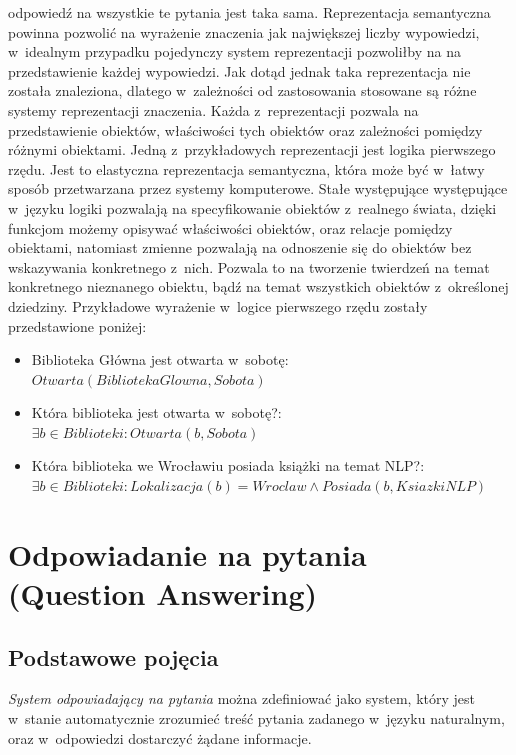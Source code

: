 \documentclass[a4paper, twoside, 12pt]{report}
\begin{document}
                odpowiedź na wszystkie te pytania jest taka sama. Reprezentacja semantyczna powinna pozwolić na wyrażenie
                znaczenia jak największej liczby wypowiedzi, w~idealnym przypadku pojedynczy system reprezentacji pozwoliłby
                na na przedstawienie każdej wypowiedzi. Jak dotąd jednak taka reprezentacja nie została znaleziona, dlatego
                w~zależności od zastosowania stosowane są różne systemy reprezentacji znaczenia. Każda z~reprezentacji
                pozwala na przedstawienie obiektów, właściwości tych obiektów oraz zależności pomiędzy różnymi obiektami.
                Jedną z~przykładowych reprezentacji jest logika pierwszego rzędu\cite{SEMANTICPARSING}. Jest to elastyczna reprezentacja semantyczna,
                która może być w~łatwy sposób przetwarzana przez systemy komputerowe. Stałe występujące występujące w~języku
                logiki pozwalają na specyfikowanie obiektów z~realnego świata, dzięki funkcjom możemy opisywać właściwości
                obiektów, oraz relacje pomiędzy obiektami, natomiast zmienne pozwalają na odnoszenie się do obiektów bez wskazywania
                konkretnego z~nich. Pozwala to na tworzenie twierdzeń na temat konkretnego nieznanego obiektu, bądź na temat
                wszystkich obiektów z~określonej dziedziny. Przykładowe wyrażenie w~logice pierwszego rzędu zostały przedstawione
                poniżej:
                \begin{itemize}
                    \item Biblioteka Główna jest otwarta w~sobotę: $ Otwarta(BibliotekaGlowna, Sobota) $
                    \item Która biblioteka jest otwarta w~sobotę?: $ \exists b \in Biblioteki: Otwarta(b, Sobota) $
                    \item Która biblioteka we Wrocławiu posiada książki na temat NLP?: \\ $ \exists b \in Biblioteki: Lokalizacja(b) = Wroclaw \land Posiada(b, KsiazkiNLP) $
                \end {itemize}


    \section{Odpowiadanie na pytania (Question Answering)}
        \subsection{Podstawowe pojęcia}
            \emph{System odpowiadający na pytania} można zdefiniować jako system, który jest w~stanie automatycznie
            zrozumieć treść pytania zadanego w~języku naturalnym, oraz w~odpowiedzi dostarczyć żądane informacje\cite{HANDBOOKNLP}.
\end{document}
